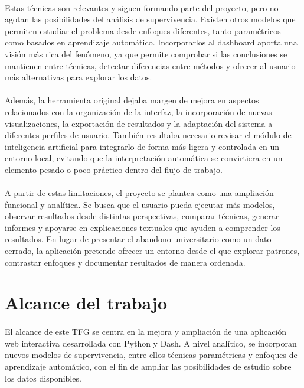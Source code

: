 \paragraph*{}Estas técnicas son relevantes y siguen formando parte del proyecto, pero no agotan las posibilidades del análisis de supervivencia. Existen otros modelos que permiten estudiar el problema desde enfoques diferentes, tanto paramétricos como basados en aprendizaje automático. Incorporarlos al dashboard aporta una visión más rica del fenómeno, ya que permite comprobar si las conclusiones se mantienen entre técnicas, detectar diferencias entre métodos y ofrecer al usuario más alternativas para explorar los datos.

\paragraph*{}Además, la herramienta original dejaba margen de mejora en aspectos relacionados con la organización de la interfaz, la incorporación de nuevas visualizaciones, la exportación de resultados y la adaptación del sistema a diferentes perfiles de usuario. También resultaba necesario revisar el módulo de inteligencia artificial para integrarlo de forma más ligera y controlada en un entorno local, evitando que la interpretación automática se convirtiera en un elemento pesado o poco práctico dentro del flujo de trabajo.

\paragraph*{}A partir de estas limitaciones, el proyecto se plantea como una ampliación funcional y analítica. Se busca que el usuario pueda ejecutar más modelos, observar resultados desde distintas perspectivas, comparar técnicas, generar informes y apoyarse en explicaciones textuales que ayuden a comprender los resultados. En lugar de presentar el abandono universitario como un dato cerrado, la aplicación pretende ofrecer un entorno desde el que explorar patrones, contrastar enfoques y documentar resultados de manera ordenada.

\section{Alcance del trabajo}

\paragraph*{}El alcance de este TFG se centra en la mejora y ampliación de una aplicación web interactiva desarrollada con Python y Dash. A nivel analítico, se incorporan nuevos modelos de supervivencia, entre ellos técnicas paramétricas y enfoques de aprendizaje automático, con el fin de ampliar las posibilidades de estudio sobre los datos disponibles.

